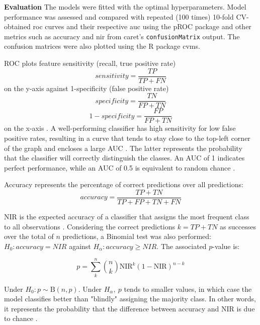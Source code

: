 \documentclass{amsart}
\begin{document}
\leavevmode\newline \textbf{Evaluation}\hspace{.25cm} The models were fitted with the optimal hyperparameters. Model performance was assessed and compared with repeated (100 times) 10-fold CV-obtained \acrfull{roc} curves and their respective \acrfull{auc} using the \textsf{pROC} package \cite{pROC} and other metrics such as accuracy and \acrfull{nir} from \textsf{caret}'s \texttt{confusionMatrix} output. The confusion matrices were also plotted using the R package \textsf{cvms}.

ROC plots feature sensitivity (recall, true positive rate) \[ sensitivity = \frac{TP}{TP+FN}\] on the y-axis against 1-specificity (false positive rate) 
\[ specificity = \frac{TN}{FP+TN}\]
\[ 1-specificity = \frac{FP}{FP+TN}\] on the x-axis \cite{James2023AnEdition}.
A well-performing classifier has high sensitivity for low false positive rates, resulting in a curve that tends to stay close to the top-left corner of the graph and encloses a large AUC \cite{James2023AnEdition}. The latter represents the probability that the classifier will correctly distinguish the classes. An AUC of 1 indicates perfect performance, while an AUC of 0.5 is equivalent to random chance \cite{James2023AnEdition}. 

Accuracy represents the percentage of correct predictions over all predictions: 
\[ accuracy = \frac{TP+TN}{TP+FP+TN+FN}\]

NIR is the expected accuracy of a classifier that assigns the most frequent class to all observations \cite{Kuhn2008BuildingPackage}. Considering the correct predictions $k =TP+TN$ as successes over the total of $n$ predictions, a Binomial test was also performed: $H_0: accuracy = NIR$ against $H_\alpha: accuracy \geq NIR$. The associated $p$-value is:

\[p = \sum_{k}^n \binom{n}{k} \textrm{NIR}^k (1-\textrm{NIR})^{n-k}\]

Under $H_0: p \sim \mathrm{B}(n,p)$. Under $H_\alpha,\ p$ tends to smaller values, in which case the model classifies better than "blindly" assigning the majority class. In other words, it represents the probability that the difference between accuracy and NIR is due to chance \cite{NIR2023}.
\end{document}
